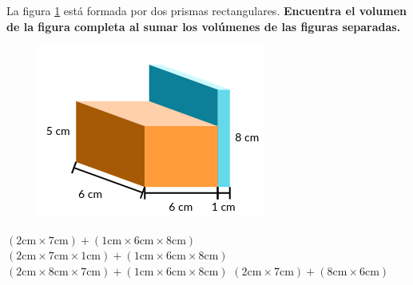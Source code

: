 La figura \ref{fig:20230316200536} está formada por dos prismas rectangulares.
\textbf{Encuentra el volumen de la figura completa al sumar los volúmenes de las figuras separadas.}

\begin{minipage}{0.45\textwidth}
    \begin{figure}[H]
        \includegraphics[width=0.8\linewidth]{../images/20230316200536}
        \caption{}
        \label{fig:20230316200536}
    \end{figure}
\end{minipage}%
\begin{minipage}{0.45\linewidth}
    \begin{choices}
        \choice $(2 \text{cm} \times 7 \text{cm})+(1 \text{cm} \times 6 \text{cm} \times 8 \text{cm})$
        \choice $(2 \text{cm} \times 7 \text{cm} \times 1 \text{cm})+(1 \text{cm} \times 6 \text{cm} \times 8 \text{cm})$
        \CorrectChoice $(2 \text{cm} \times 8 \text{cm} \times 7 \text{cm})+(1 \text{cm} \times 6 \text{cm} \times 8 \text{cm})$
        \choice $(2 \text{cm} \times 7 \text{cm})+(8 \text{cm} \times 6 \text{cm})$
    \end{choices}
\end{minipage}
